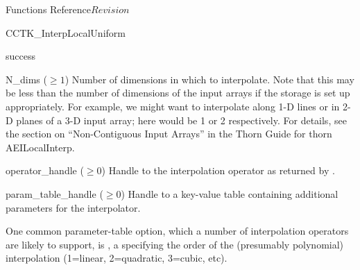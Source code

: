 \begin{cactuspart}{ Functions Reference}{}{$Revision$}
\begin{FunctionDescription}{CCTK\_InterpLocalUniform}
\begin{ResultSection}
\begin{Result}{0}
success
\end{Result}
\end{ResultSection}

\begin{ParameterSection}
\begin{Parameter}{N\_dims ($\ge 1$)}
Number of dimensions in which to interpolate.
Note that this may be less than the number of dimensions of the
input arrays if the storage is set up appropriately.  For example,
we might want to interpolate along 1-D lines or in 2-D planes of a
3-D input array; here  would be 1 or 2 respectively.
For details, see the section on ``Non-Contiguous Input Arrays''
in the Thorn Guide for thorn AEILocalInterp.
\end{Parameter}
\begin{Parameter}{operator\_handle ($\ge 0$)}
\hbox{}
Handle to the interpolation operator as returned by
.
\end{Parameter}
\begin{Parameter}{param\_table\_handle ($\ge 0$)}
Handle to a key-value table containing additional parameters for
the interpolator.

One common parameter-table option, which a number of interpolation
operators are likely to support, is , a 
specifying the order of the (presumably polynomial) interpolation
(1=linear, 2=quadratic, 3=cubic, etc).


\end{Parameter}
\end{ParameterSection}
\end{FunctionDescription}
\end{cactuspart}
